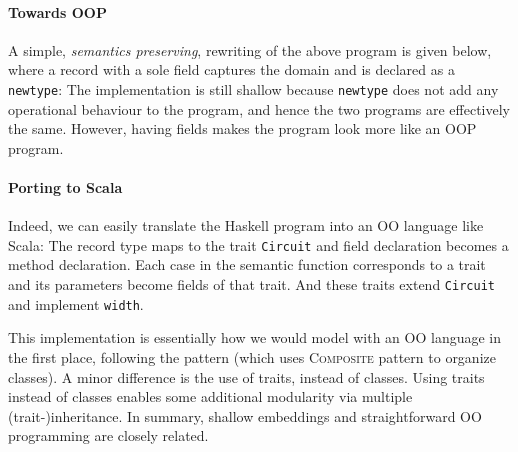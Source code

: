 \paragraph{Towards OOP}
A simple, \emph{semantics preserving}, rewriting of the above program is given
below, where a record with a sole field captures the domain and is declared as a \lstinline{newtype}:
The implementation is still shallow because \lstinline{newtype} does not add any operational
behaviour to the program, and hence the two programs are effectively the
same.  However, having fields makes the program look more like an 
OOP program.

\paragraph{Porting to Scala}
Indeed, we can easily translate the Haskell program into an OO
language like Scala:
The record type maps to the trait \lstinline{Circuit} and field
declaration becomes a method declaration.
Each case in the semantic function corresponds to a trait and its parameters become fields of that trait.
And these traits extend \lstinline{Circuit} and implement \lstinline{width}.


This implementation is essentially how we would model \dsl with an OO language in the first
place, following the \interp pattern (which uses \textsc{Composite} pattern to
organize classes). A minor difference is the use of
traits, instead of classes. Using traits instead of
classes enables some additional modularity via multiple (trait-)inheritance.
In summary, shallow embeddings and straightforward OO programming are closely
related.
